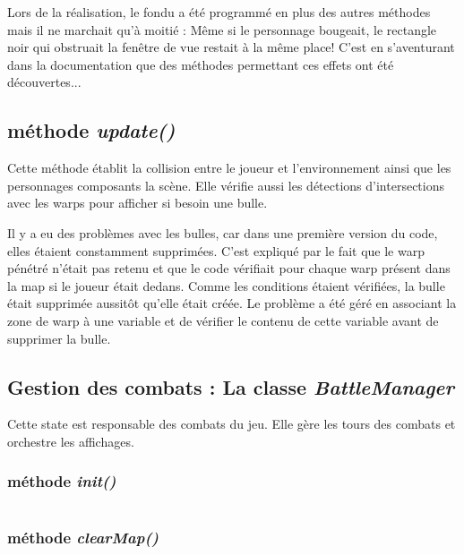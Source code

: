 \documentclass[11pt]{article}
\begin{document}
\begin{appendices}
Lors de la réalisation, le fondu a été programmé en plus des autres méthodes mais il ne marchait qu'à moitié : Même si le personnage bougeait, le rectangle noir qui obstruait la fenêtre de vue restait à la même place! C'est en s'aventurant dans la documentation que des méthodes permettant ces effets ont été découvertes...
\subsection{méthode \textit{update()}}
Cette méthode établit la collision entre le joueur et l'environnement ainsi que les personnages composants la scène. Elle vérifie aussi les détections d'intersections avec les warps pour afficher si besoin une bulle.

Il y a eu des problèmes avec les bulles, car dans une première version du code, elles étaient constamment supprimées. C'est expliqué par le fait que le warp pénétré n'était pas retenu et que le code vérifiait pour chaque warp présent dans la map si le joueur était dedans. Comme les conditions étaient vérifiées, la bulle était supprimée aussitôt qu'elle était créée. Le problème a été géré en associant la zone de warp à une variable et de vérifier le contenu de cette variable avant de supprimer la bulle.
\subsection{Gestion des combats : La classe \textit{BattleManager}}
Cette state est responsable des combats du jeu. Elle gère les tours des combats et orchestre les affichages. 
\subsubsection{méthode \textit{init()}}
\begin{lstlisting}[language=JavaScript]

\end{lstlisting} 
\subsubsection{méthode \textit{clearMap()}}
\begin{lstlisting}[language=JavaScript]

\end{lstlisting} 

\end{appendices}
\end{document}
